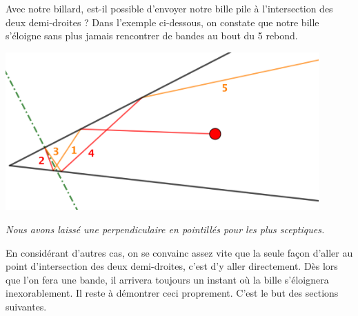 Avec notre billard, est-il possible d'envoyer notre bille pile à l'intersection des deux demi-droites ?
Dans l'exemple ci-dessous, on constate que notre bille s'éloigne sans plus jamais rencontrer de bandes au bout du 5\ieme{} rebond.
 
\medskip

\begin{center}
	\includegraphics[width=12cm]{basic-math-pool/example-divergence.png}
	
	\itshape\small
	Nous avons laissé une perpendiculaire en pointillés pour les plus sceptiques.
\end{center}

\medskip

En considérant d'autres cas, on se convainc assez vite que la seule façon d'aller au point d'intersection des deux demi-droites, c'est d'y aller directement.
Dès lors que l'on fera une bande, il arrivera toujours un instant où la bille s'éloignera inexorablement. Il reste à démontrer ceci proprement. C'est le but des sections suivantes.